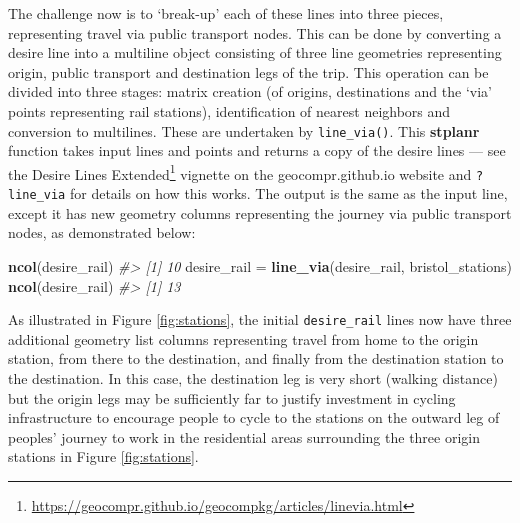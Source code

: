 \documentclass[]{krantz}
\newenvironment{Shaded}{\begin{snugshade}}{\end{snugshade}}
\newcommand{\CommentTok}[1]{\textcolor[rgb]{0.37,0.37,0.37}{\textit{#1}}}
\newcommand{\KeywordTok}[1]{\textcolor[rgb]{0.27,0.27,0.27}{\textbf{#1}}}
\newcommand{\NormalTok}[1]{#1}
\newcommand{\StringTok}[1]{\textcolor[rgb]{0.5,0.5,0.5}{#1}}
\let\rmarkdownfootnote\footnote%
\def\footnote{\protect\rmarkdownfootnote}
\renewcommand{\href}[2]{#2\footnote{\url{#1}}}
\begin{document}
The challenge now is to `break-up' each of these lines into three pieces, representing travel via public transport nodes.
This can be done by converting a desire line into a multiline object consisting of three line geometries representing origin, public transport and destination legs of the trip.
This operation can be divided into three stages: matrix creation (of origins, destinations and the `via' points representing rail stations), identification of nearest neighbors and conversion to multilines.
These are undertaken by \texttt{line\_via()}.
This \textbf{stplanr} function takes input lines and points and returns a copy of the desire lines --- see the \href{https://geocompr.github.io/geocompkg/articles/linevia.html}{Desire Lines Extended} vignette on the geocompr.github.io website and \texttt{?line\_via} for details on how this works.
The output is the same as the input line, except it has new geometry columns representing the journey via public transport nodes, as demonstrated below:

\begin{Shaded}
\begin{Highlighting}[]
\KeywordTok{ncol}\NormalTok{(desire_rail)}
\CommentTok{#> [1] 10}
\NormalTok{desire_rail =}\StringTok{ }\KeywordTok{line_via}\NormalTok{(desire_rail, bristol_stations)}
\KeywordTok{ncol}\NormalTok{(desire_rail)}
\CommentTok{#> [1] 13}
\end{Highlighting}
\end{Shaded}

As illustrated in Figure \ref{fig:stations}, the initial \texttt{desire\_rail} lines now have three additional geometry list columns representing travel from home to the origin station, from there to the destination, and finally from the destination station to the destination.
In this case, the destination leg is very short (walking distance) but the origin legs may be sufficiently far to justify investment in cycling infrastructure to encourage people to cycle to the stations on the outward leg of peoples' journey to work in the residential areas surrounding the three origin stations in Figure \ref{fig:stations}.
\end{document}
